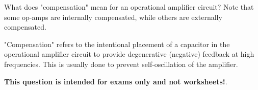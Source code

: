

What does "compensation" mean for an operational amplifier circuit?  Note that some op-amps are internally compensated, while others are externally compensated.







"Compensation" refers to the intentional placement of a capacitor in the operational amplifier circuit to provide degenerative (negative) feedback at high frequencies.  This is usually done to prevent self-oscillation of the amplifier.







{\bf This question is intended for exams only and not worksheets!}.



